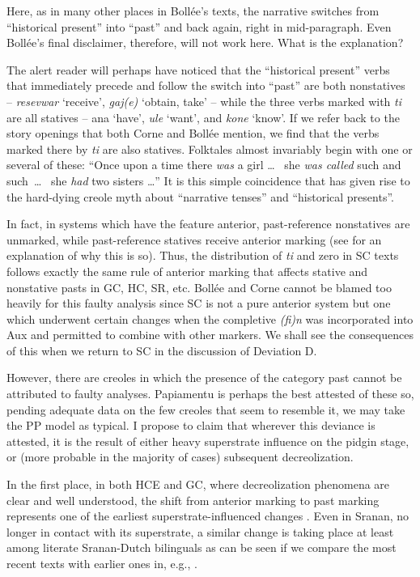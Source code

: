 Here, as in many other places in Bollée's texts, the narrative switches from ``historical present'' into ``past'' and back again, right in mid-paragraph. Even Bollée's final disclaimer, therefore, will not work here. What is the explanation?

The alert reader will perhaps have noticed that the ``historical present'' verbs that immediately precede and follow the switch into ``past'' are both nonstatives -- \textit{resevwar} `receive', \textit{gaj(e)} `obtain, take' -- while the three verbs marked with \textit{ti} are all statives -- ana `have', \textit{ule} `want', and \textit{kone} `know'. If we refer back to the story openings that both Corne and Bollée mention, we find that the verbs marked there by \textit{ti} are also statives. Folktales almost invariably begin with one or several of these: ``Once upon a time there \textit{was} a girl \ldots~ she \textit{was called} such and such~\ldots~ she \textit{had} two sisters \ldots '' It is this simple coincidence that has given rise to the hard-dying creole myth about ``narrative tenses'' and ``historical presents''.

In fact, in systems which have the feature anterior, past-reference nonstatives are unmarked, while past-reference statives receive anterior
marking (see \citet[Chapter 2]{Bickerton1975} for an explanation of why this is so). Thus, the distribution of \textit{ti} and zero in SC texts follows exactly the same rule of anterior marking that affects stative and nonstative pasts in GC, HC, SR, etc.
Bollée and Corne cannot be blamed too heavily for this faulty analysis since SC is not a pure anterior system but one which under\-went certain changes when the completive \textit{(fi)n} was incorporated into Aux and permitted to combine with other markers. We shall see the consequences of this when we return to SC in the discussion of Deviation D.

However, there are creoles in which the presence of the category past cannot be attributed to faulty analyses. Papiamentu is perhaps the best attested of these so, pending adequate data on the few creoles that seem to resemble it, we may take the PP model as typical. I pro\-pose to claim that wherever this deviance is attested, it is the result of either heavy superstrate influence on the pidgin stage, or (more prob\-able in the majority of cases) subsequent decreolization.

In the first place, in both HCE and GC, where decreolization phenomena are clear and well understood, the shift from anterior mark\-ing to past marking represents one of the earliest superstrate-influenced changes \citep{Bickerton1975,Bickerton1977}. Even in Sranan, no longer in contact with its superstrate, a similar change is taking place at least among literate Sranan-Dutch bilinguals as can be seen if we compare the most recent texts with earlier ones in, e.g., \citet{Voorhoeve1976}.

